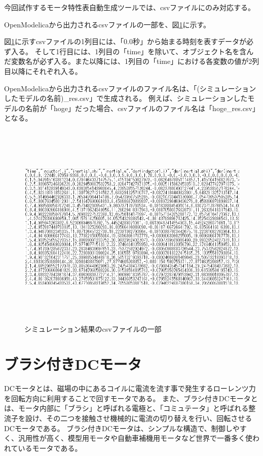今回試作するモータ特性表自動生成ツールでは、csvファイルにのみ対応する。

OpenModelicaから出力されるcsvファイルの一部を、図\ref{fig:simyu_csv}に示す。

図\ref{fig:simyu_csv}に示すcsvファイルの1列目には、「0.0秒」から始まる時刻を表すデータが必ず入る。
そして1行目には、1列目の「time」を除いて、オブジェクト名を含んだ変数名が必ず入る。また以降には、1列目の「time」における各変数の値が2列目以降にそれぞれ入る。

OpenModelicaから出力されるcsvファイルのファイル名は、「(シミュレーションしたモデルの名前)\_res.csv」で生成される。
例えば、シミュレーションしたモデルの名前が「hoge」だった場合、csvファイルのファイル名は「hoge\_res.csv」となる。
\begin{figure}[t]
	\centering
	\includegraphics[width=16.5cm,height=10cm]{./Image/simyu_csv.png}
	\caption{シミュレーション結果のcsvファイルの一部}
	\label{fig:simyu_csv}
\end{figure}
\section{ブラシ付きDCモータ}\label{bDCmotor}
DCモータとは、磁場の中にあるコイルに電流を流す事で発生するローレンツ力を回転方向に利用することで回すモータである\cite{モータ原理}。
また、ブラシ付きDCモータとは、モータ内部に「ブラシ」と呼ばれる電極と、「コミュテータ」と呼ばれる整流子を設け、その二つを接触させ機械的に電流の切り替えを行い、回転させるDCモータである。
ブラシ付きDCモータは、シンプルな構造で、制御しやすく、汎用性が高く、模型用モータや自動車補機用モータなど世界で一番多く使われているモータである\cite{モータ使う}。
